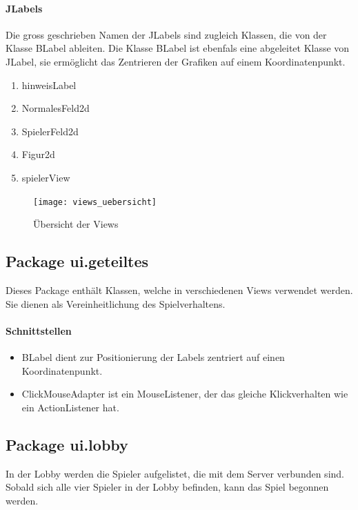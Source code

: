 \documentclass[12pt,halfparskip]{scrartcl}
\begin{document}
\paragraph{JLabels}
Die gross geschrieben Namen der JLabels sind zugleich Klassen, die von der Klasse BLabel ableiten. Die Klasse BLabel ist ebenfals eine abgeleitet Klasse von JLabel, sie ermöglicht das Zentrieren der Grafiken auf einem Koordinatenpunkt.

\begin{enumerate}
	\item hinweisLabel
	\item NormalesFeld2d
	\item SpielerFeld2d
	\item Figur2d
	\item spielerView
\end{enumerate}

\begin{figure}[H]
	\centering
	\texttt{[image: views\_uebersicht]}
	\caption{Übersicht der Views}
	\label{fig:views_uebersicht}
\end{figure}

\clearpage
\subsection{Package ui.geteiltes}

Dieses Package enthält Klassen, welche in verschiedenen Views verwendet werden. Sie dienen als Vereinheitlichung des Spielverhaltens.

\paragraph{Schnittstellen}
\begin{itemize}
	\item BLabel dient zur Positionierung der Labels zentriert auf einen Koordinatenpunkt.
	\item ClickMouseAdapter ist ein MouseListener, der das gleiche Klickverhalten wie ein ActionListener hat.
\end{itemize}

\subsection{Package ui.lobby}

In der Lobby werden die Spieler aufgelistet, die mit dem Server verbunden sind. Sobald sich alle vier Spieler in der Lobby befinden, kann das Spiel begonnen werden.
\end{document}
